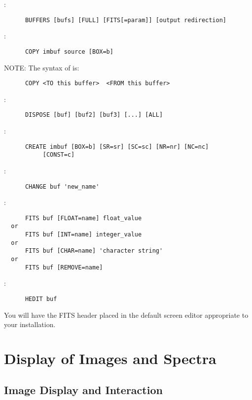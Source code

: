 :
\begin{verbatim}
      BUFFERS [bufs] [FULL] [FITS[=param]] [output redirection]
\end{verbatim}

\noindent {}:
\begin{verbatim}
      COPY imbuf source [BOX=b]
\end{verbatim}
NOTE:  The syntax of  is:
\begin{verbatim}
      COPY <TO this buffer>  <FROM this buffer>
\end{verbatim}

\noindent {}:
\begin{verbatim}
      DISPOSE [buf] [buf2] [buf3] [...] [ALL]
\end{verbatim}

\noindent {}:
\begin{verbatim}
      CREATE imbuf [BOX=b] [SR=sr] [SC=sc] [NR=nr] [NC=nc]
		   [CONST=c]
\end{verbatim}

\noindent {}:
\begin{verbatim}
      CHANGE buf 'new_name'
\end{verbatim}

\noindent {}:
\begin{verbatim}
      FITS buf [FLOAT=name] float_value
  or
      FITS buf [INT=name] integer_value
  or
      FITS buf [CHAR=name] 'character string'
  or
      FITS buf [REMOVE=name]
\end{verbatim}

\noindent {}:
\begin{verbatim}
      HEDIT buf
\end{verbatim}
You will have the FITS header placed in the default screen editor appropriate
to your installation.


\section{Display of Images and Spectra}

\subsection{Image Display and Interaction}

